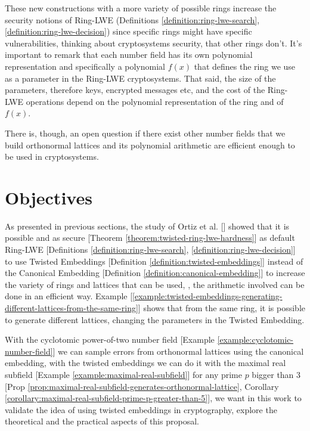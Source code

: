 \documentclass[a4paper,12pt]{article}
\begin{document}
These new constructions with a more variety of possible rings increase the security notions of Ring-LWE (Definitions \ref{definition:ring-lwe-search}, \ref{definition:ring-lwe-decision}) since specific rings might have specific vulnerabilities, thinking about cryptosystems security, that other rings don't. It's important to remark that each number field has its own polynomial representation and specifically a polynomial \(f(x)\) that defines the ring we use as a parameter in the Ring-LWE cryptosystems. That said, the size of the parameters, therefore keys, encrypted messages etc, and the cost of the Ring-LWE operations depend on the polynomial representation of the ring and of \(f(x)\).

There is, though, an open question if there exist other number fields that we build orthonormal lattices and its polynomial arithmetic are efficient enough to be used in cryptosystems. 

\section{Objectives}
\label{objectives}
As presented in previous sections, the study of Ortiz et al. [\cite{Ortiz2021}] showed that it is possible and as secure [Theorem \ref{theorem:twisted-ring-lwe-hardness}] as default Ring-LWE [Definitions \ref{definition:ring-lwe-search}, \ref{definition:ring-lwe-decision}] to use Twisted Embeddings [Definition \ref{definition:twisted-embeddings}] instead of the Canonical Embedding [Definition \ref{definition:canonical-embedding}] to increase the variety of rings and lattices that can be used, \ie, the arithmetic involved can be done in an efficient way. Example [\ref{example:twisted-embeddings-generating-different-lattices-from-the-same-ring}] shows that from the same ring, it is possible to generate different lattices, changing the parameters in the Twisted Embedding.

With the cyclotomic power-of-two number field [Example \ref{example:cyclotomic-number-field}] we can sample errors from orthonormal lattices using the canonical embedding, with the twisted embeddings we can do it with the maximal real subfield [Example \ref{example:maximal-real-subfield}] for any prime \(p\) bigger than \(3\) [Prop \ref{prop:maximal-real-subfield-generates-orthonormal-lattice}, Corollary \ref{corollary:maximal-real-subfield-prime-p-greater-than-5}], we want in this work to validate the idea of using twisted embeddings in cryptography, explore the theoretical and the practical aspects of this proposal.
\end{document}
